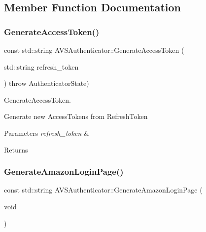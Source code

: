 \subsection{Member Function Documentation}
\mbox{\label{classAVSAuthenticator_a501ad6b1063945e065ed00d5f25e7dd8}} 
\subsubsection{\texorpdfstring{Generate\+Access\+Token()}{GenerateAccessToken()}}
{\footnotesize\ttfamily const std\+::string A\+V\+S\+Authenticator\+::\+Generate\+Access\+Token (\begin{DoxyParamCaption}\item[{std\+::string}]{refresh\+\_\+token }\end{DoxyParamCaption}) throw  Authenticator\+State) }



Generate\+Access\+Token. 

Generate new Access\+Tokens from Refresh\+Token 
\begin{DoxyParams}{Parameters}
{\em refresh\+\_\+token} & \\
\hline
\end{DoxyParams}
\begin{DoxyReturn}{Returns}

\end{DoxyReturn}
\mbox{\label{classAVSAuthenticator_ad7c95c1a81852aff4c9bedb96da49ee8}} 
\subsubsection{\texorpdfstring{Generate\+Amazon\+Login\+Page()}{GenerateAmazonLoginPage()}}
{\footnotesize\ttfamily const std\+::string A\+V\+S\+Authenticator\+::\+Generate\+Amazon\+Login\+Page (\begin{DoxyParamCaption}\item[{void}]{ }\end{DoxyParamCaption})}



